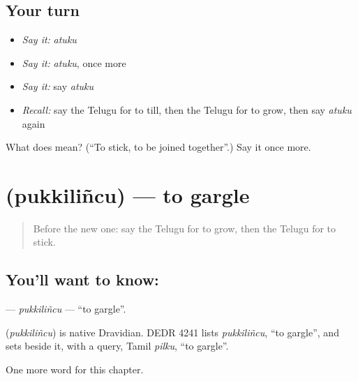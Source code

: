 \subsection*{Your turn}
\begin{itemize}
\raggedright
  \item \emph{Say it:} \emph{atuku}
  \item \emph{Say it:} \emph{atuku}, once more
  \item \emph{Say it:} say \emph{atuku}
  \item \emph{Recall:} say the Telugu for to till, then the Telugu for to grow, then say \emph{atuku} again
\end{itemize}

\begin{tcolorbox}[breakable,colback=teal!4,colframe=teal!35!black,title={Before you move on}]
What does  mean? (\textquotedblleft{}To stick, to be joined together\textquotedblright{}.) Say it once more.
\end{tcolorbox}
\section[\texorpdfstring{\te{పుక్కిలించు} (pukkiliñcu)}{పుక్కిలించు (pukkiliñcu)}]{ (pukkiliñcu) — to gargle}

\label{lesson:TE-C208-pukkilincu}



\begin{quote}
Before the new one: say the Telugu for to grow, then the Telugu for to stick.
\end{quote}

\subsection*{You'll want to know: }
\textbf{} — \emph{pukkiliñcu} — \textquotedblleft{}to gargle\textquotedblright{}.

\begin{cousinweb}
\textbf{} (\emph{pukkiliñcu}) is native Dravidian. DEDR 4241 lists \emph{pukkiliñcu}, \textquotedblleft{}to gargle\textquotedblright{}, and sets beside it, with a query, Tamil \emph{pilku}, \textquotedblleft{}to gargle\textquotedblright{}.
\end{cousinweb}

\begin{grammarlens}[title={What you've built}]
One more word for this chapter.
\end{grammarlens}

